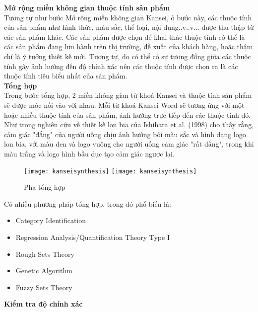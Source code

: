 \textbf{Mở rộng miền không gian thuộc tính sản phẩm}\\

Tương tự như bước Mở rộng miền không gian Kansei, ở bước này, các thuộc tính của sản phẩm như hình thức, màu sắc, thể loại, nội dung..v..v... được thu thập từ các sản phẩm khác. Các sản phẩm được chọn để khai thác thuộc tính có thể là các sản phẩm đang lưu hành trên thị trường, đề xuất của khách hàng, hoặc thậm chí là ý tưởng thiết kế mới. Tương tự, do có thể có sự tương đồng giữa các thuộc tính gây ảnh hưởng đến độ chính xác  nên các thuộc tính được chọn ra là các thuộc tính tiêu biểu nhất của sản phẩm.\\

\textbf{Tổng hợp}\\

Trong bước tổng hợp, 2 miền không gian từ khoá Kansei và thuộc tính sản phẩm sẽ được móc nối vào với nhau. Mỗi từ khoá Kansei Word sẽ tương ứng với một hoặc nhiều thuộc tính của sản phẩm, ảnh hưởng trực tiếp đến các thuộc tính đó. Như trong nghiên cứu về thiết kế lon bia của Ishihara et al. (1998)\cite{ishihira98} cho thấy rằng, cảm giác "đắng" của người uống chịu ảnh hưởng bởi màu sắc và hình dạng logo lon bia, với màu đen và logo vuông cho người uống cảm giác "rất đắng", trong khi màu trắng và logo hình bầu dục tạo cảm giác ngược lại.

 \begin{figure}[H]
  \begin{center}
    \ifpdf
      \texttt{[image: kanseisynthesis]}
    \else
      \texttt{[image: kanseisynthesis]}
    \fi
    \caption{Pha tổng hợp}
    \label{KanseiSynthesis}
  \end{center}
\end{figure}

Có nhiều phương pháp tổng hợp, trong đó phổ biến là:
\begin{itemize}
	\item Category Identification
	\item Regression Analysis/Quantification Theory Type I
	\item Rough Sets Theory
	\item Genetic Algorithm
	\item Fuzzy Sets Theory\\
\end{itemize}  

\textbf{Kiểm tra độ chính xác}\\

